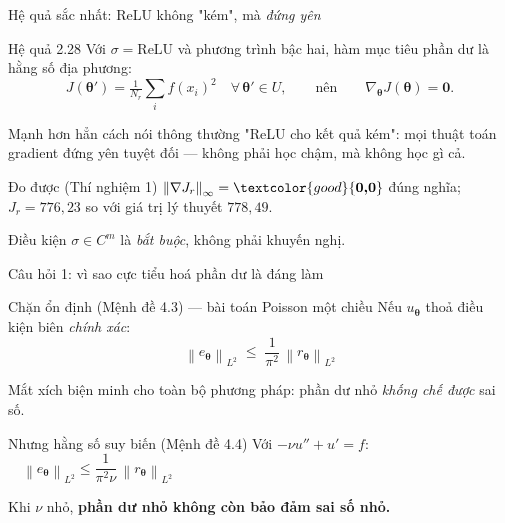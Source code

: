 \documentclass[aspectratio=169,11pt]{beamer}
\newcommand{\btheta}{\bm{\theta}}
\newcommand{\norm}[1]{\left\lVert #1 \right\rVert}
\newcommand{\good}[1]{\textcolor{good}{\textbf{#1}}}
\newcommand{\bad}[1]{\textcolor{bad}{\textbf{#1}}}
\begin{document}
\begin{frame}{Hệ quả sắc nhất: ReLU không "kém", mà \emph{đứng yên}}
\begin{alertblock}{Hệ quả 2.28}
Với $\sigma = \mathrm{ReLU}$ và phương trình bậc hai, hàm mục tiêu phần dư là
\alert{hằng số địa phương}:
\[
J(\btheta') = \tfrac{1}{N_r}\textstyle\sum_i f(x_i)^2
\quad \forall\,\btheta' \in U,
\qquad\text{nên}\qquad \nabla_{\btheta}J(\btheta) = \bm{0}.
\]
\end{alertblock}

\medskip
Mạnh hơn hẳn cách nói thông thường "ReLU cho kết quả kém": mọi thuật toán gradient
đứng yên \alert{tuyệt đối} --- không phải học chậm, mà không học gì cả.

\medskip
\begin{block}{Đo được (Thí nghiệm 1)}
$\norm{\nabla J_r}_\infty = \good{0{,}0}$ đúng nghĩa;
$J_r = 776{,}23$ so với giá trị lý thuyết $778{,}49$.

\smallskip
\footnotesize Điều kiện $\sigma \in C^m$ là \emph{bắt buộc}, không phải khuyến nghị.
\end{block}
\end{frame}

\begin{frame}{Câu hỏi 1: vì sao cực tiểu hoá phần dư là đáng làm}
\begin{block}{Chặn ổn định (Mệnh đề 4.3) --- bài toán Poisson một chiều}
Nếu $u_{\btheta}$ thoả điều kiện biên \emph{chính xác}:
\[
\norm{e_{\btheta}}_{L^2} \;\le\; \frac{1}{\pi^{2}}\,\norm{r_{\btheta}}_{L^2}
\]
\end{block}

Mắt xích biện minh cho toàn bộ phương pháp: phần dư nhỏ \emph{khống chế được} sai số.

\medskip
\begin{alertblock}{Nhưng hằng số suy biến (Mệnh đề 4.4)}
Với $-\nu u'' + u' = f$:
$\quad\norm{e_{\btheta}}_{L^2} \le \dfrac{1}{\pi^{2}\nu}\,\norm{r_{\btheta}}_{L^2}$

\smallskip
Khi $\nu$ nhỏ, \bad{phần dư nhỏ không còn bảo đảm sai số nhỏ.}
\end{alertblock}
\end{frame}
\end{document}
